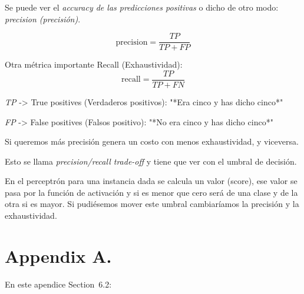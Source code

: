 \documentclass[twoside,11pt]{article}
\begin{document}
Se puede ver el \textit{accuracy de las predicciones positivas} o dicho de otro modo: \textit{precision (precisión)}.

$$
\mathrm{precision} = \frac{TP}{TP + FP}
$$

Otra métrica importante Recall (Exhaustividad):
$$
\mathrm{recall} = \frac{TP}{TP + FN}
$$

\textit{TP} -> True positives (Verdaderos positivos): "*Era cinco y has dicho cinco*"

\textit{FP} -> False positives (Falsos positivo): "*No era cinco y has dicho cinco*"

Si queremos más precisión genera un costo con menos exhaustividad, y viceversa.

Esto se llama \textit{precision/recall trade-off} y tiene que ver con el umbral de decisión. 

En el perceptrón para una instancia dada se calcula un valor (score), ese valor se pasa por 
la función de activación y si es menor que cero será de una clase y de la otra si es mayor. 
Si pudiésemos mover este umbral cambiaríamos la precisión y la exhaustividad.




\newpage

\appendix
\section*{Appendix A.}
\label{app:theorem}



En este apendice
Section~6.2:

\noindent

\vskip 0.2in

\end{document}
